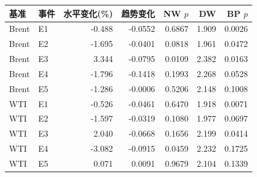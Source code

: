 \begin{tabular}{llrrrrr}
\toprule
基准 & 事件 & 水平变化(\%) & 趋势变化 & NW $p$ & DW & BP $p$ \\
\midrule
Brent & E1 & -0.488 & -0.0552 & 0.6867 & 1.909 & 0.0026 \\
Brent & E2 & -1.695 & -0.0401 & 0.0818 & 1.961 & 0.0472 \\
Brent & E3 & 3.344 & -0.0795 & 0.0109 & 2.382 & 0.0163 \\
Brent & E4 & -1.796 & -0.1418 & 0.1993 & 2.268 & 0.0528 \\
Brent & E5 & -1.286 & -0.0006 & 0.5206 & 2.148 & 0.1008 \\
WTI & E1 & -0.526 & -0.0461 & 0.6470 & 1.918 & 0.0071 \\
WTI & E2 & -1.597 & -0.0319 & 0.1080 & 1.977 & 0.0697 \\
WTI & E3 & 2.040 & -0.0668 & 0.1656 & 2.199 & 0.0414 \\
WTI & E4 & -3.082 & -0.0915 & 0.0459 & 2.232 & 0.1725 \\
WTI & E5 & 0.071 & 0.0091 & 0.9679 & 2.104 & 0.1339 \\
\bottomrule
\end{tabular}
